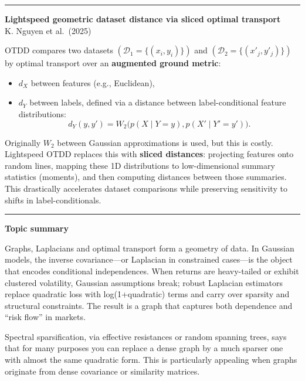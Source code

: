 \documentclass[a5paper]{article}
\providecommand{\tightlist}{%
  \setlength{\itemsep}{0pt}\setlength{\parskip}{0pt}}
\def\subsection#1{{\par\bigskip\goodbreak\large\bfseries #1\par}}
\begin{document}
\begin{center}\rule{0.5\linewidth}{0.5pt}\end{center}

\textbf{Lightspeed geometric dataset distance via sliced optimal
transport}\\
K. Nguyen et al.~(2025)

OTDD compares two datasets $(\mathcal{D}_1 = \{(x_i,y_i)\})$ and
$(\mathcal{D}_2=\{(x'_j,y'_j)\})$ by optimal transport over an
\textbf{augmented ground metric}:

\begin{itemize}
\tightlist
\item
  $d_X$ between features (e.g., Euclidean),
\item
  $d_Y$ between labels, defined via a distance between label-conditional
  feature distributions: \[ d_Y(y,y') =
  W_2\bigl(p(X\mid Y=y),p(X'\mid Y'=y')\bigr). \]
\end{itemize}

Originally $W_2$ between Gaussian approximations is used, but this is
costly. Lightspeed OTDD replaces this with \textbf{sliced distances}:
projecting features onto random lines, mapping these 1D distributions to
low-dimensional summary statistics (moments), and then computing
distances between those summaries. This drastically accelerates dataset
comparisons while preserving sensitivity to shifts in
label-conditionals.

\begin{center}\rule{0.5\linewidth}{0.5pt}\end{center}

\subsection{Topic summary}\label{topic-summary-6}

Graphs, Laplacians and optimal transport form a geometry of data. In
Gaussian models, the inverse covariance---or Laplacian in constrained
cases---is the object that encodes conditional independences. When
returns are heavy-tailed or exhibit clustered volatility, Gaussian
assumptions break; robust Laplacian estimators replace quadratic loss
with log(1+quadratic) terms and carry over sparsity and structural
constraints. The result is a graph that captures both dependence and
``risk flow'' in markets.

Spectral sparsification, via effective resistances or random spanning
trees, says that for many purposes you can replace a dense graph by a
much sparser one with almost the same quadratic form. This is
particularly appealing when graphs originate from dense covariance or
similarity matrices.
\end{document}
